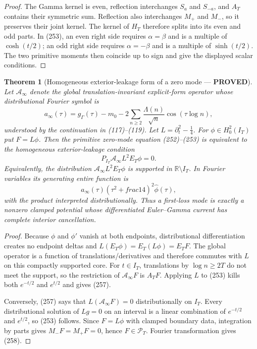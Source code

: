 \documentclass[11pt]{article}
\newtheorem{theorem}{Theorem}
\newcommand{\PROVED}{\textcolor{green!45!black}{\textbf{PROVED}}}
\begin{document}
\begin{proof}
The Gamma kernel is even, reflection interchanges $S_a$ and $S_{-a}$, and
$A_T$ contains their symmetric sum.  Reflection also interchanges $M_+$ and
$M_-$, so it preserves their joint kernel.  The kernel of $H_T$ therefore
splits into its even and odd parts.  In (253), an even right side requires
$\alpha=\beta$ and is a multiple of $\cosh(t/2)$; an odd right side requires
$\alpha=-\beta$ and is a multiple of $\sinh(t/2)$.  The two primitive moments
then coincide up to sign and give the displayed scalar conditions.
\end{proof}

\begin{theorem}[Homogeneous exterior-leakage form of a zero mode --- \PROVED]
Let $\mathcal A_\infty$ denote the global translation-invariant explicit-form
operator whose distributional Fourier symbol is
\begin{equation}
 a_\infty(\tau)=g_\Gamma(\tau)-m_0
 -2\sum_{n\ge2}\frac{\Lambda(n)}{\sqrt n}
      \cos(\tau\log n),                               \tag{256}
\end{equation}
understood by the continuation in (117)--(119).  Let
$L=\partial_t^2-\tfrac14$.  For $\phi\in H_0^2(I_T)$ put
$F=L\phi$.  Then the primitive zero-mode equation (252)--(253) is equivalent
to the homogeneous exterior-leakage condition
\begin{equation}
 \boxed{P_{I_T}\mathcal A_\infty L^2E_T\phi=0.}       \tag{257}
\end{equation}
Equivalently, the distribution
$\mathcal A_\infty L^2E_T\phi$ is supported in
$\mathbb R\setminus I_T$.  In Fourier variables its generating entire
function is
\begin{equation}
 a_\infty(\tau)(\tau^2+	frac14)^2\widehat\phi(\tau), \tag{258}
\end{equation}
with the product interpreted distributionally.  Thus a first-loss mode is
exactly a nonzero clamped potential whose differentiated Euler--Gamma current
has complete interior cancellation.
\end{theorem}

\begin{proof}
Because $\phi$ and $\phi'$ vanish at both endpoints, distributional
differentiation creates no endpoint deltas and
$L(E_T\phi)=E_T(L\phi)=E_TF$.  The global operator is a function of
translations/derivatives and therefore commutes with $L$ on this compactly
supported core.  For $t\in I_T$, translations by $\log n\ge2T$ do not meet
the support, so the restriction of $\mathcal A_\infty F$ is $A_TF$.
Applying $L$ to (253) kills both $e^{-t/2}$ and $e^{t/2}$ and gives (257).

Conversely, (257) says that $L(\mathcal A_\infty F)=0$ distributionally on
$I_T$.  Every distributional solution of $Lg=0$ on an interval is a linear
combination of $e^{-t/2}$ and $e^{t/2}$, so (253) follows.  Since
$F=L\phi$ with clamped boundary data, integration by parts gives
$M_-F=M_+F=0$, hence $F\in\mathcal P_T$.  Fourier transformation gives
(258).
\end{proof}
\end{document}
